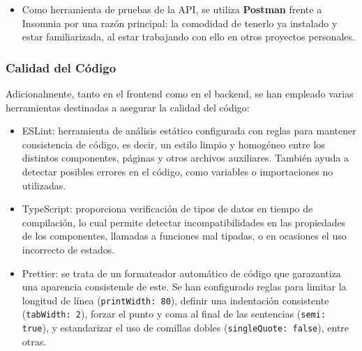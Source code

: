 \begin{itemize}
    \item Como herramienta de pruebas de la API, se utiliza \textbf{Postman} frente a Insomnia por una razón principal: la comodidad de tenerlo ya instalado y estar familiarizada, al estar trabajando con ello en otros proyectos personales.
\end{itemize}

\subsubsection{Calidad del Código}
Adicionalmente, tanto en el frontend como en el backend, se han empleado varias herramientas destinadas a asegurar la calidad del código:

\begin{itemize}
    \item ESLint: herramienta de análisis estático configurada con reglas para mantener consistencia de código, es decir, un estilo limpio y homogéneo entre los distintos componentes, páginas y otros archivos auxiliares. También ayuda a detectar posibles errores en el código, como variables o importaciones no utilizadas.\cite{eslint_docs}
    \item TypeScript: proporciona verificación de tipos de datos en tiempo de compilación, lo cual permite detectar incompatibilidades en las propiedades de los componentes, llamadas a funciones mal tipadas, o en ocasiones el uso incorrecto de estados.
    \item Prettier: se trata de un formateador automático de código que garazantiza una aparencia consistende de este. Se han configurado reglas para limitar la longitud de línea (\texttt{printWidth: 80}), definir una indentación consistente (\texttt{tabWidth: 2}), forzar el punto y coma al final de las sentencias (\texttt{semi: true}), y estandarizar el uso de comillas dobles (\texttt{singleQuote: false}), entre otras.\cite{prettier_docs}
\end{itemize}